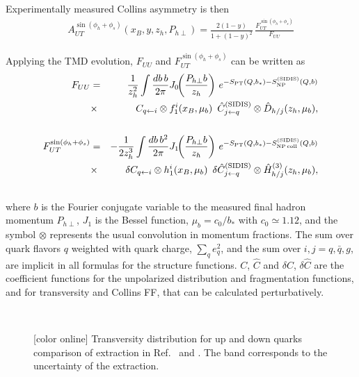 \documentclass[twocolumn,showpacs,preprintnumbers,amsmath,amssymb,floatfix,prd]{revtex4}
\newcommand*{\FigPath}{.}%
\begin{document}
Experimentally measured Collins asymmetry is then
\begin{align}
A_{UT}^{\sin\left(\phi_h +\phi_s\right)}(x_B, y, z_h, P_{h\perp})
=  
\frac{2 (1-y)}{1+(1-y)^2} \, \frac{F_{UT}^{\sin\left(\phi_h +\phi_s\right)}}{F_{UU}}  
  \label{eq:aut-collins1}
\end{align}


Applying the TMD evolution, $F_{UU}$ and $F_{UT}^{\sin\left(\phi_h +\phi_s\right)}$ can be written as~\cite{Collins:1981uk,Collins:1984kg,Boer:2001he,Kang:2011mr}
\begin{eqnarray}
F_{UU} &=& \frac{1}{z_h^2}\int \frac{db\, b}{2\pi} J_0\!\!\left( \frac{{P}_{h\perp} b}{z_h} \right)\,
e^{-S_{\rm PT}(Q,b_*)-S_{\rm NP}^{\rm (SIDIS)}(Q,b)}  \nonumber\\
&\times & \, C_{q\leftarrow i}\otimes f_{1}^{i}(x_B,\mu_b)  \,\,\,
\hat{C}_{j\leftarrow q}^{\rm (SIDIS)}\otimes \hat D_{h/j}(z_h,\mu_b), \nonumber \\ ~ \label{fuu}\\
F_{UT}^{\sin\left(\phi_h +\phi_s\right)} &=& -\frac{1}{2 z_h^3} \int \frac{db \, b^2}{2\pi} J_1\!\!\left( \frac{{P}_{h\perp} b}{z_h} \right)\,
e^{-S_{\rm PT}(Q,b_*)-S_{\rm NP\, coll}^{\rm (SIDIS)}(Q,b)} \nonumber\\
&\times & \, \delta C_{q\leftarrow i}\otimes h_{1}^{i}(x_B,\mu_b)  \,\,\,
\delta \hat{C}_{j\leftarrow q}^{\rm (SIDIS)}\otimes \hat H_{h/j}^{(3)}(z_h,\mu_b) , \nonumber \\ 
~\label{eq:fut1}
\end{eqnarray}
%
where $b$ is the Fourier conjugate variable to the measured final hadron
momentum ${P}_{h\perp}$, $J_1$ is
the Bessel function, $\mu_b=c_0/b_*$ with $c_0\simeq 1.12$, and the symbol
$\otimes$ represents the usual convolution in momentum fractions.
The sum over quark flavors $q$ weighted with quark
charge, $\sum_q e^2_q$, and the sum over $i,j = q,\bar q, g$, are 
implicit in all formulas for the structure functions. 
$C$, $\hat{C} $ and $\delta C$, $\delta \hat{C} $ are the coefficient functions for the unpolarized distribution and fragmentation functions, 
and for transversity and Collins FF, that can be calculated perturbatively.
% 
 \begin{figure}
 \centering
 \\
  \caption{[color online] Transversity distribution for up and down quarks comparison of extraction in 
 Ref.~\cite{Kang:2015msa} and \cite{Anselmino:2013vqa}. The band corresponds to the uncertainty of 
 the extraction. 
  }
 \label{fig:transversity}
 \end{figure}
\end{document}
